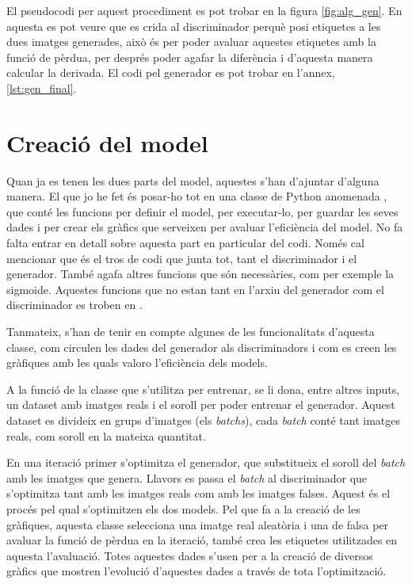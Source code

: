 El pseudocodi per aquest procediment es pot trobar en la figura \ref{fig:alg_gen}. En aquesta es pot veure que es crida al discriminador perquè posi etiquetes a les dues imatges generades, això és per poder avaluar aquestes etiquetes amb la funció de pèrdua, per després poder agafar la diferència i d'aquesta manera calcular la derivada. El codi pel generador es pot trobar en l'annex, \ref{lst:gen_final}.

\section{Creació del model}

Quan ja es tenen les dues parts del model, aquestes s'han d'ajuntar d'alguna manera. El que jo he fet és posar-ho tot en una classe de Python anomenada , que conté les funcions per definir el model, per executar-lo, per guardar les seves dades i per crear els gràfics que serveixen per avaluar l'eficiència del model. No fa falta entrar en detall sobre aquesta part en particular del codi. Només cal mencionar que és el tros de codi que junta tot, tant el discriminador i el generador. També agafa altres funcions que són necessàries, com per exemple la sigmoide. Aquestes funcions que no estan tant en l'arxiu del generador com el discriminador es troben en .

Tanmateix, s'han de tenir en compte algunes de les funcionalitats d'aquesta classe, com circulen les dades del generador als discriminadors i com es creen les gràfiques amb les quals valoro l'eficiència dels models.

A la funció de la classe  que s'utilitza per entrenar,  se li dona, entre altres inputs, un dataset amb imatges reals i el soroll per poder entrenar el generador. Aquest dataset es divideix en grups d'imatges (els \textit{batchs}), cada \textit{batch} conté tant imatges reals, com soroll en la mateixa quantitat.

En una iteració primer s'optimitza el generador, que substitueix el soroll del \textit{batch} amb les imatges que genera. Llavors es passa el \textit{batch} al discriminador que s'optimitza tant amb les imatges reals com amb les imatges falses. Aquest és el procés pel qual s'optimitzen els dos models. Pel que fa a la creació de les gràfiques, aquesta classe selecciona una imatge real aleatòria i una de falsa per avaluar la funció de pèrdua en la iteració, també crea les etiquetes utilitzades en aquesta l'avaluació. Totes aquestes dades s'usen per a la creació de diversos gràfics que mostren l'evolució d'aquestes dades a través de tota l'optimització.

